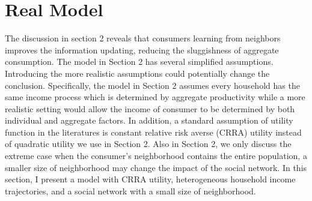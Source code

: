\documentclass[12pt,letterpaper]{article}
\begin{document}
\section{Real Model}
The discussion in section 2 reveals that consumers learning from neighbors improves the information updating, reducing the sluggishness of aggregate consumption. The model in Section 2 has several simplified assumptions. Introducing the more realistic assumptions could potentially change the conclusion. Specifically, the model in Section 2 assumes every household has the same income process which is determined by aggregate productivity while a more realistic setting would allow the income of consumer to be determined by both individual and aggregate factors. In addition, a standard assumption of utility function in the literatures is constant relative risk averse (CRRA) utility instead of quadratic utility we use in Section 2. Also in Section 2, we only discuss the extreme case when the consumer's neighborhood contains the entire population, a smaller size of neighborhood may change the impact of the social network. In this section, I present a model with CRRA utility, heterogeneous household income trajectories, and a social network with a small size of neighborhood. 
\end{document}
